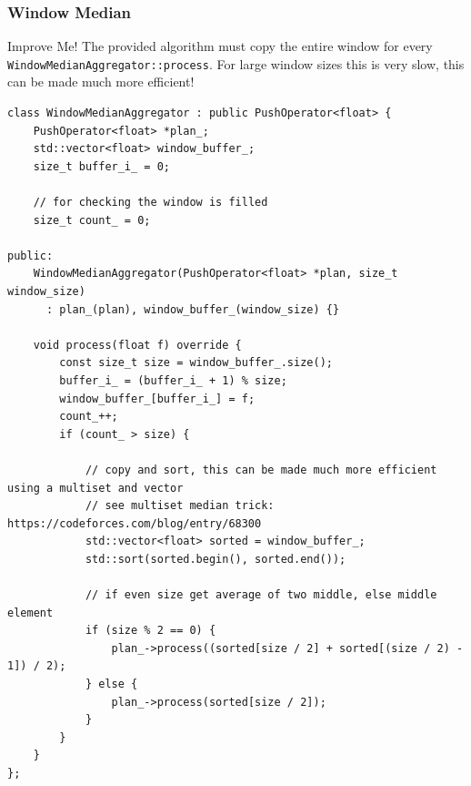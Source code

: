 \subsubsection{Window Median}
\begin{sidenotebox}{Improve Me!}
    The provided algorithm must copy the entire window for every \texttt{WindowMedianAggregator::process}. For large window sizes this is very slow, this can be made much more efficient!
\end{sidenotebox}
\begin{verbatim}
class WindowMedianAggregator : public PushOperator<float> {
    PushOperator<float> *plan_;
    std::vector<float> window_buffer_;
    size_t buffer_i_ = 0;

    // for checking the window is filled
    size_t count_ = 0;

public:
    WindowMedianAggregator(PushOperator<float> *plan, size_t window_size) 
      : plan_(plan), window_buffer_(window_size) {}

    void process(float f) override {
        const size_t size = window_buffer_.size();
        buffer_i_ = (buffer_i_ + 1) % size;
        window_buffer_[buffer_i_] = f;
        count_++;
        if (count_ > size) {

            // copy and sort, this can be made much more efficient using a multiset and vector
            // see multiset median trick: https://codeforces.com/blog/entry/68300
            std::vector<float> sorted = window_buffer_;
            std::sort(sorted.begin(), sorted.end());

            // if even size get average of two middle, else middle element
            if (size % 2 == 0) {
                plan_->process((sorted[size / 2] + sorted[(size / 2) - 1]) / 2);
            } else {
                plan_->process(sorted[size / 2]);
            }
        }
    }
};
\end{verbatim}


